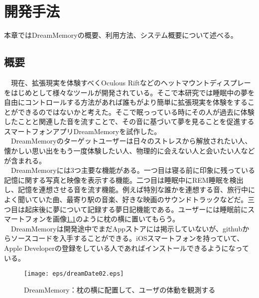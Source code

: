 \chapter{開発手法}
\label{chap:coding}

本章ではDreamMemoryの概要、利用方法、システム概要について述べる。

\section{概要}
　現在、拡張現実を体験すべくOculous Riftなどのヘットマウントディスプレーをはじめとして様々なツールが開発されている。そこで本研究では睡眠中の夢を自由にコントロールする方法があれば誰もがより簡単に拡張現実を体験をすることができるのではないかと考えた。そこで眠っっている時にその人が過去に体験したことと関連した音を流すことで、その音に基づいて夢を見ることを促進するスマートフォンアプリDreamMemoryを試作した。\\
　DreamMemoryのターゲットユーザーは日々のストレスから解放されたい人、懐かしい思い出をもう一度体験したい人、物理的に会えない人と会いたい人などが含まれる。\\
　DreamMemoryには3つ主要な機能がある。一つ目は寝る前に印象に残っている記憶に関する写真と映像を表示する機能。二つ目は睡眠中にREM睡眠を検出し、記憶を連想させる音を流す機能。例えば特別な誰かを連想する音、旅行中によく聞いていた曲、最寄り駅の音楽、好きな映画のサウンドトラックなどだ。三つ目は起床後に夢について記録する夢日記機能である。ユーザーには睡眠前にスマートフォンを画像\ref{DreamMemoryImage}のように枕の横に置いてもらう。\\
　DreamMemoryは開発途中でまだAppストアには掲示していないが、githubからソースコードを入手することができる。iOSスマートフォンを持っていて、Apple Developerの登録をしている人であればインストールできるようになっている。

\begin{figure}[htbp]
\begin{center}
\texttt{[image: eps/dreamDate02.eps]}
\caption{DreamMemory：枕の横に配置して、ユーザの体動を観測する}
\label{DreamMemoryImage}
\end{center}
\end{figure}

